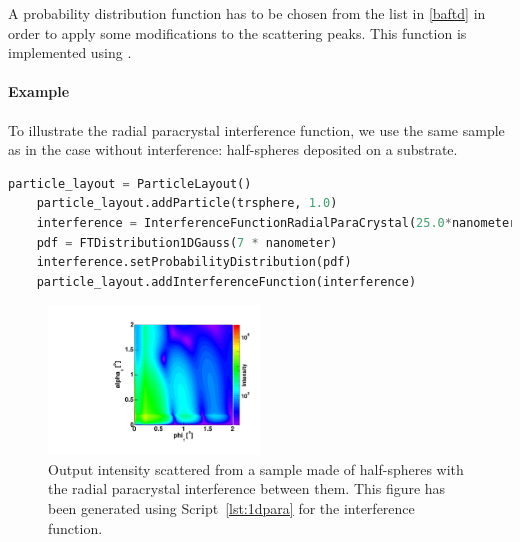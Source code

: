 A probability distribution function  has to be chosen from the list in \cref{baftd} in order to apply some modifications to the scattering peaks. This function is implemented using .



\paragraph{Example}
To illustrate the radial paracrystal interference function, we use the same sample as in the case without interference: half-spheres deposited on a substrate.

\begin{lstlisting}[language=python, style=eclipseboxed,numbers=none,nolol,caption={\Code{Python} script to define the radial paracrystal interference function between half-spheres, where \Code{trsphere} is of type \Code{Particle}.},label={lst:1dpara}]
    particle_layout = ParticleLayout()
    particle_layout.addParticle(trsphere, 1.0)
    interference = InterferenceFunctionRadialParaCrystal(25.0*nanometer, 1e3*nanometer)
    pdf = FTDistribution1DGauss(7 * nanometer)
    interference.setProbabilityDistribution(pdf)
    particle_layout.addInterferenceFunction(interference)
\end{lstlisting}



\begin{figure}[tb]
\begin{center}
\includegraphics[angle=-90,width=0.5\textwidth]{fig/gisasmap/HSphere_1DDL.pdf}
\end{center}
\caption{Output intensity scattered from a sample made of half-spheres with the radial paracrystal interference between them. This figure has been generated using Script~\ref{lst:1dpara} for the interference function.}
\label{fig:1ddl}
\end{figure}

